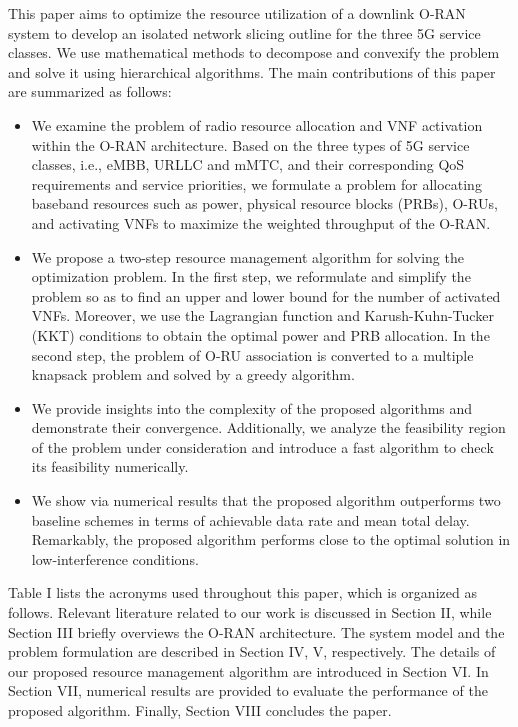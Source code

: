 \documentclass[12pt, letterpaper]{article}
\begin{document}
This paper aims to optimize the resource utilization of a downlink O-RAN system to develop an isolated network slicing outline for the three 5G service classes.
We use mathematical methods to decompose and convexify the problem and solve it using hierarchical algorithms.
 The main contributions of this paper are summarized as follows:
\begin{itemize}
\item We examine the problem of radio resource allocation and VNF activation within the O-RAN architecture.
Based on the three types of 5G service classes, i.e., eMBB, URLLC and mMTC, and their corresponding QoS requirements and service priorities, we formulate a problem for allocating baseband resources such as power, physical resource blocks (PRBs), O-RUs, and activating VNFs to maximize the weighted throughput of the O-RAN.
\item We propose a two-step resource management algorithm for solving the optimization problem.
In the first step, we reformulate and simplify the problem so as to find an upper and lower bound for the number of activated VNFs. Moreover, we use the Lagrangian function and Karush-Kuhn-Tucker (KKT) conditions to obtain the optimal power and PRB allocation. In the second step, the problem of O-RU association is converted to a multiple knapsack problem and solved by a greedy algorithm.
\item We provide insights into the complexity of the proposed algorithms and demonstrate their convergence. Additionally, we analyze the feasibility region of the problem under consideration and introduce a fast algorithm to check its feasibility numerically.
\item We show via numerical results that the proposed algorithm outperforms two baseline schemes in terms of achievable data rate and mean total delay. Remarkably, the proposed algorithm performs close to the optimal solution in low-interference conditions.
\end{itemize}

Table I lists the acronyms used throughout this paper, which is organized as follows.
Relevant literature related to our work is discussed in Section II, while Section III briefly overviews the O-RAN architecture.
The system model and the problem formulation are described in Section IV, V, respectively. The details of our proposed resource management algorithm are introduced in Section VI. In Section VII, numerical results are provided to evaluate the performance of the proposed algorithm. Finally, Section VIII concludes the paper.
\end{document}
